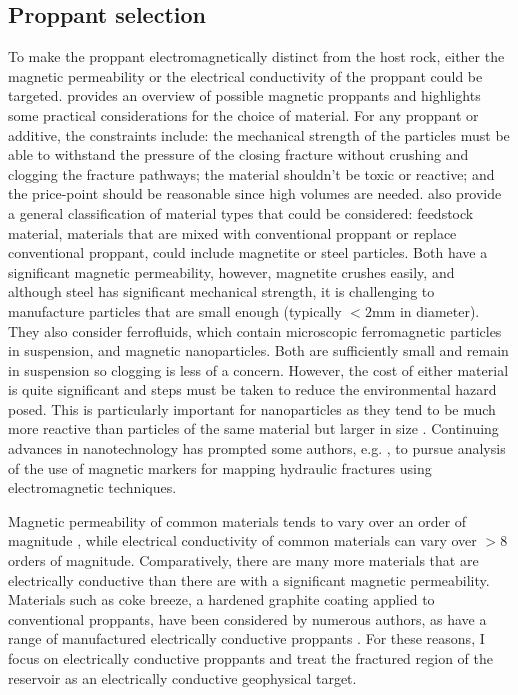 \subsection{Proppant selection}
To make the proppant electromagnetically distinct from the host rock, either the magnetic permeability or the electrical conductivity of the proppant could be targeted. \cite{Zawadzki2016} provides an overview of possible magnetic proppants and highlights some practical considerations for the choice of material. For any proppant or additive, the constraints include: the mechanical strength of the particles must be able to withstand the pressure of the closing fracture without crushing and clogging the fracture pathways; the material shouldn’t be toxic or reactive; and the price-point should be reasonable since high volumes are needed. \cite{Zawadzki2016} also provide a general classification of material types that could be considered: feedstock material, materials that are mixed with conventional proppant or replace conventional proppant, could include magnetite or steel particles. Both have a significant magnetic permeability, however, magnetite crushes easily, and although steel has significant mechanical strength, it is challenging to manufacture particles that are small enough (typically $< 2$mm in diameter). They also consider ferrofluids, which contain microscopic ferromagnetic particles in suspension, and magnetic nanoparticles. Both are sufficiently small and remain in suspension so clogging is less of a concern. However, the cost of either material is quite significant and steps must be taken to reduce the environmental hazard posed. This is particularly important for nanoparticles as they tend to be much more reactive than particles of the same material but larger in size \citep{Zawadzki2016}. Continuing advances in nanotechnology has prompted some authors, e.g. \citep{Rahmani2014}, to pursue analysis of the use of magnetic markers for mapping hydraulic fractures using electromagnetic techniques.

Magnetic permeability of common materials tends to vary over an order of magnitude \cite{Telford1990}, while electrical conductivity of common materials can vary over $> 8$ orders of magnitude. Comparatively, there are many more materials that are electrically conductive than there are with a significant magnetic permeability. Materials such as coke breeze, a hardened graphite coating applied to conventional proppants, have been considered by numerous authors, as have a range of manufactured electrically conductive proppants \citep{Pardo2013, Hoversten2015, Weiss2015, Labrecque2016, Hu2018}. For these reasons, I focus on electrically conductive proppants and treat the fractured region of the reservoir as an electrically conductive geophysical target.

